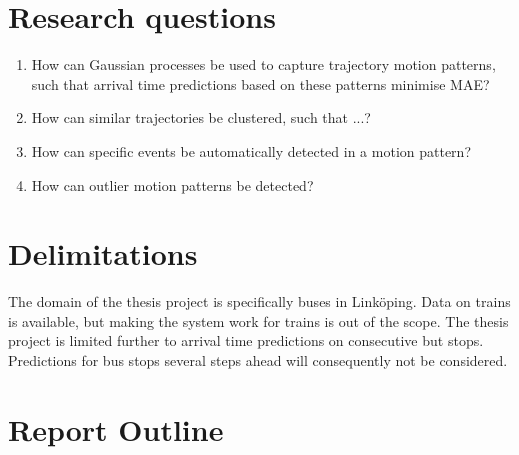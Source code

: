 \section{Research questions}
\label{sec:research-questions}

\begin{enumerate}
\item How can Gaussian processes be used to capture trajectory motion
  patterns, such that arrival time predictions based on these patterns minimise MAE?

\item How can similar trajectories be clustered, such that ...?
  
\item How can specific events be automatically detected in a
  motion pattern?

\item How can outlier motion patterns be detected?
\end{enumerate}



\section{Delimitations}
\label{sec:delimitations}
The domain of the thesis project is specifically buses in
Linköping. Data on trains is available, but making the system
work for trains is out of the scope. The thesis project is limited further
to arrival time predictions on consecutive
but stops. Predictions for bus stops several steps ahead will
consequently not be considered.



\section{Report Outline}
